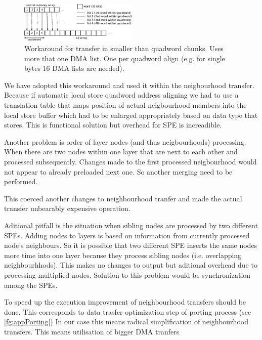 \begin{figure}
    \centering
    \includegraphics[width=0.5\textwidth]{data/multipleDMAList}
    \caption[multiple DMA list workaround]
{
  Workaround for transfer in smaller than quadword chunks.
  Uses more that one DMA list.
  One per quadword align (e.g. for single bytes 16 DMA lists are needed).
}
    \label{fg:multipleDMAList}
\end{figure}

We have adopted this workaround and used it within the neigbourhood transfer.
Because if automatic local store quadword address aligning we had to use a translation table that maps position of actual neigbourhood members into the local store buffer which had to be enlarged appropriately based on data type that stores.
This is functional solution but overhead for SPE is increadible.

\par
Another problem is order of layer nodes (and thus neigbourhoods) processing.
When there are two nodes within one layer that are next to each other and processed subsequently.
Changes made to the first processed neigbourhood would not appear to already preloaded next one.
So another merging need to be performed.

\par
This coerced another changes to neighbourhood tranfer and made the actual transfer unbearably expensive operation.

\par
Aditional pitfall is the situation when sibling nodes are processed by two different SPEs.
Adding nodes to layers is based on information from currently processed node's neighbours.
So it is possible that two different SPE inserts the same nodes more time into one layer because they process sibling nodes (i.e. overlapping neighbourhhods).
This makes no changes to output but aditional overhead due to processing multiplied nodes.
Solution to this problem would be synchronization among the SPEs.

\par
To speed up the execution improvement of neighbourhood transfers should be done.
This corresponds to data trasfer optimization step of porting process (see \ref{fg:appPorting})
In our case this means radical simplification of neighbourhood transfers.
This means utilisation of bigger DMA tranfers

